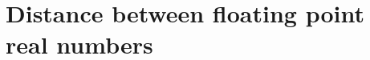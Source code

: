 %            
%            
%            








    \newpage 
    \FloatBarrier
    \section{Distance between floating point real numbers} \label{sec:roundoff}


